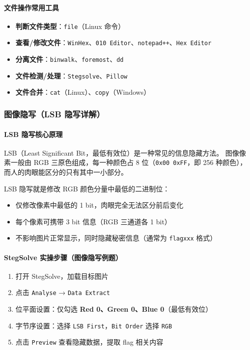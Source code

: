 \paragraph{文件操作常用工具}
\begin{itemize}[leftmargin=*]
    \item \textbf{判断文件类型}：\texttt{file}（Linux 命令）
    \item \textbf{查看/修改文件}：\texttt{WinHex}、\texttt{010 Editor}、\texttt{notepad++}、\texttt{Hex Editor}
    \item \textbf{分离文件}：\texttt{binwalk}、\texttt{foremost}、\texttt{dd}
    \item \textbf{文件检测/处理}：\texttt{Stegsolve}、\texttt{Pillow}
    \item \textbf{文件合并}：\texttt{cat}（Linux）、\texttt{copy}（Windows）
\end{itemize}

\subsubsection{图像隐写（LSB 隐写详解）}
\paragraph{LSB 隐写核心原理}
LSB（Least Significant Bit，最低有效位）是一种常见的信息隐藏方法。
图像像素一般由 RGB 三原色组成，每一种颜色占 8 位（\texttt{0x00~0xFF}，即 256 种颜色），而人的肉眼能区分的只有其中一小部分。

LSB 隐写就是修改 RGB 颜色分量中最低的二进制位：
\begin{itemize}[leftmargin=*]
    \item 仅修改像素中最低的 1 bit，肉眼完全无法区分前后变化
    \item 每个像素可携带 3 bit 信息（RGB 三通道各 1 bit）
    \item 不影响图片正常显示，同时隐藏秘密信息（通常为 \texttt{flag{xxx}} 格式）
\end{itemize}

\paragraph{StegSolve 实操步骤（图像隐写例题）}
\begin{enumerate}[leftmargin=*]
    \item 打开 StegSolve，加载目标图片
    \item 点击 \texttt{Analyse} → \texttt{Data Extract}
    \item 位平面设置：仅勾选 \textbf{Red 0、Green 0、Blue 0}（最低有效位）
    \item 字节序设置：选择 \texttt{LSB First}，\texttt{Bit Order} 选择 \texttt{RGB}
    \item 点击 \texttt{Preview} 查看隐藏数据，提取 flag 相关内容
\end{enumerate}

